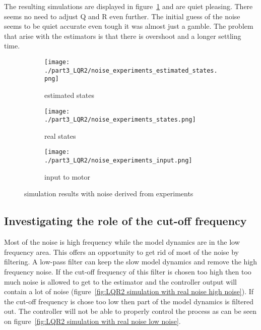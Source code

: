 	The resulting simulations are displayed in figure~\ref{fig:LQR2 simulation with real noise} and are quiet pleasing. There seems no need to adjust Q and R even further. The initial guess of the noise seems to be quiet accurate even tough it was almost just a gamble. The problem that arise with the estimators is that there is overshoot and a longer settling time.
	\begin{figure}[H]
		\centering
		\begin{subfigure}[b]{0.45\textwidth}
			\texttt{[image: ./part3\_LQR2/noise\_experiments\_estimated\_states.png]}
			\caption{estimated states}
		\end{subfigure}
		\begin{subfigure}[b]{0.45\textwidth}
			\texttt{[image: ./part3\_LQR2/noise\_experiments\_states.png]}
			\caption{real states}
		\end{subfigure}
		\begin{subfigure}[b]{0.45\textwidth}
			\texttt{[image: ./part3\_LQR2/noise\_experiments\_input.png]}
			\caption{input to motor}
		\end{subfigure}
		\caption{simulation results with noise derived from experiments}
		\label{fig:LQR2 simulation with real noise}
	\end{figure}

\subsection{Investigating the role of the cut-off frequency}
Most of the noise is high frequency while the model dynamics are in the low frequency area. This offers an opportunity to get rid of most of the noise by filtering. A low-pass filter can keep the slow model dynamics and remove the high frequency noise. If the cut-off frequency of this filter is chosen too high then too much noise is allowed to get to the estimator and the controller output will contain a lot of noise (figure~\ref{fig:LQR2 simulation with real noise high noise}). If the cut-off frequency is chose too low then part of the model dynamics is filtered out. The controller will not be able to properly control the process as can be seen on figure~\ref{fig:LQR2 simulation with real noise low noise}.

